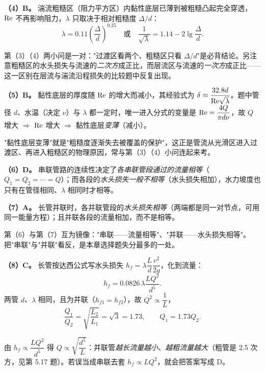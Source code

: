 \begin{jie}
\textbf{（4）B。} 湍流粗糙区（阻力平方区）内黏性底层已薄到被粗糙凸起完全穿透，$\mathrm{Re}$ 不再影响阻力，$\lambda$ 只取决于相对粗糙度 $\Delta/d$：
\[\lambda=0.11\left(\frac{\Delta}{d}\right)^{0.25}\quad\text{或}\quad\frac{1}{\sqrt{\lambda}}=1.14-2\lg\frac{\Delta}{d}.\]
\end{jie}
\begin{yicuo}
第（3）（4）两小问是一对："过渡区看两个、粗糙区只看 $\Delta/d$"是必背结论。另注意粗糙区的水头损失与流速的\emph{二次方}成正比，而层流区与流速的\emph{一次方}成正比——这一区别在层流与湍流沿程损失的比较题中反复出现。
\end{yicuo}

\begin{jie}
\textbf{（5）B。} 黏性底层的厚度随 $\mathrm{Re}$ 的增大而减小，其经验式为 $\delta\approx\dfrac{32.8d}{\mathrm{Re}\sqrt{\lambda}}$。题中管径 $d$、水温（决定 $\nu$）与 $\lambda$ 都一定时，唯一进入分式的变量是 $\mathrm{Re}=\dfrac{4Q}{\pi d\nu}$，故 $Q$ 增大 $\Rightarrow$ $\mathrm{Re}$ 增大 $\Rightarrow$ 黏性底层\emph{变薄}（减小）。
\end{jie}
\begin{yicuo}
"黏性底层变薄"就是"粗糙度逐渐失去被覆盖的保护"，这正是管流从光滑区进入过渡区、再进入粗糙区的物理原因，常与第（3）（4）小问连起来考。
\end{yicuo}

\begin{jie}
\textbf{（6）D。} 串联管路的连续性决定了\emph{各串联管段通过的流量相等}（$Q_1=Q_2=\cdots=Q$）；而各段的\emph{水头损失一般不相等}（水头损失相加），水力坡度也只有在管径相同、$\lambda$ 相同时才相等。
\end{jie}

\begin{jie}
\textbf{（7）A。} 长管并联时，各并联管段的\emph{水头损失相等}（两端都是同一对节点，可用同一能量方程）；且并联各段的流量相加，而不是相等。
\end{jie}
\begin{yicuo}
第（6）与第（7）互为镜像："串联——流量相等"、"并联——水头损失相等"。把"串联"与"并联"看反，是本章选择题失分最多的一处。
\end{yicuo}

\begin{jie}
\textbf{（8）C。} 长管按达西公式写水头损失 $h_f=\lambda\dfrac{L}{d}\dfrac{v^2}{2g}$，化到流量：
\[h_f=0.0826\,\lambda\frac{LQ^2}{d^5}.\]
两管 $d$、$\lambda$ 相同，且为并联（$h_{f1}=h_{f2}$），故 $Q^2\propto\dfrac{1}{L}$，
\[\frac{Q_1}{Q_2}=\sqrt{\frac{L_2}{L_1}}=\sqrt{3}=1.73,\qquad Q_1=1.73Q_2.\]
\end{jie}
\begin{yicuo}
由 $h_f\propto\dfrac{LQ^2}{d^5}$ 得 $Q\propto\sqrt{\dfrac{d^5}{L}}$：并联管\emph{越长流量越小}、\emph{越粗流量越大}（粗管是 2.5 次方，见第 5.17 题）。若误当成串联去套 $h_f\propto LQ^2$，就会把答案写成 D。
\end{yicuo}

